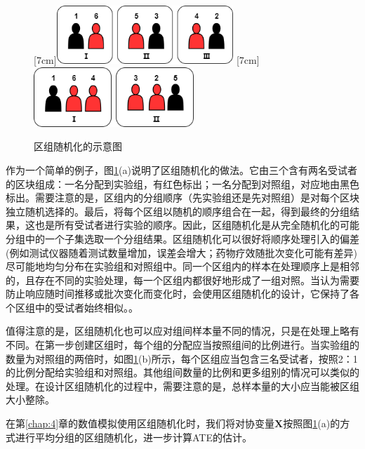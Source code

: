 \begin{figure}[!hbtp]
  \centering
                [7cm]{\includegraphics[height=2.2cm]{figures/blockRandom.drawio.png}}
  \hspace{1cm}
                [7cm]{\includegraphics[height=2.25cm]{figures/blockRandom_inequal.drawio.png}}
  \caption{区组随机化的示意图}
  \label{fig:blockrandom}
\end{figure}

作为一个简单的例子，图\ref{fig:blockrandom}(a)说明了区组随机化的做法。它由三个含有两名受试者的区块组成：一名分配到实验组，有红色标出；一名分配到对照组，对应地由黑色标出。需要注意的是，区组内的分组顺序（先实验组还是先对照组）是对每个区块独立随机选择的。最后，将每个区组以随机的顺序组合在一起，得到最终的分组结果，这也是所有受试者进行实验的顺序。因此，区组随机化是从完全随机化的可能分组中的一个子集选取一个分组结果。区组随机化可以很好将顺序处理引入的偏差(例如测试仪器随着测试数量增加，误差会增大；药物疗效随批次变化可能有差异)尽可能地均匀分布在实验组和对照组中。同一个区组内的样本在处理顺序上是相邻的，且存在不同的实验处理，每一个区组内都很好地形成了一组对照。当认为需要防止响应随时间推移或批次变化而变化时，会使用区组随机化的设计，它保持了各个区组中的受试者始终相似。\cite{suresh2011overview}。


值得注意的是，区组随机化也可以应对组间样本量不同的情况，只是在处理上略有不同。在第一步创建区组时，每个组的分配应当按照组间的比例进行。当实验组的数量为对照组的两倍时，如图\ref{fig:blockrandom}(b)所示，每个区组应当包含三名受试者，按照2：1的比例分配给实验组和对照组。其他组间数量的比例和更多组别的情况可以类似的处理。在设计区组随机化的过程中，需要注意的是，总样本量的大小应当能被区组大小整除\cite{burger2020importance}。


在第\ref{chap:4}章的数值模拟使用区组随机化时，我们将对协变量$\mathbf{X}$按照图\ref{fig:blockrandom}(a)的方式进行平均分组的区组随机化，进一步计算ATE的估计。



